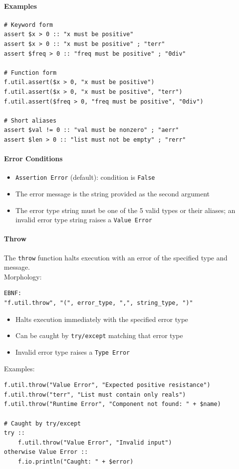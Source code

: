 \paragraph{Examples}
\begin{verbatim}
# Keyword form
assert $x > 0 :: "x must be positive"
assert $x > 0 :: "x must be positive" ; "terr"
assert $freq > 0 :: "freq must be positive" ; "0div"

# Function form
f.util.assert($x > 0, "x must be positive")
f.util.assert($x > 0, "x must be positive", "terr")
f.util.assert($freq > 0, "freq must be positive", "0div")

# Short aliases
assert $val != 0 :: "val must be nonzero" ; "aerr"
assert $len > 0 :: "list must not be empty" ; "rerr"
\end{verbatim}

\paragraph{Error Conditions}
\begin{itemize}
\item \texttt{Assertion Error} (default): condition is \texttt{False}
\item The error message is the string provided as the second argument
\item The error type string must be one of the 5 valid types or their aliases; an invalid error type string raises a \texttt{Value Error}
\end{itemize}

\paragraph{Throw}
The \texttt{throw} function halts execution with an error of the specified type and message.\\
Morphology:
\begin{verbatim}
EBNF:
"f.util.throw", "(", error_type, ",", string_type, ")"
\end{verbatim}
\begin{itemize}
\item Halts execution immediately with the specified error type
\item Can be caught by \texttt{try/except} matching that error type
\item Invalid error type raises a \texttt{Type Error}
\end{itemize}
Examples:
\begin{verbatim}
f.util.throw("Value Error", "Expected positive resistance")
f.util.throw("terr", "List must contain only reals")
f.util.throw("Runtime Error", "Component not found: " + $name)

# Caught by try/except
try ::
    f.util.throw("Value Error", "Invalid input")
otherwise Value Error ::
    f.io.println("Caught: " + $error)
\end{verbatim}

